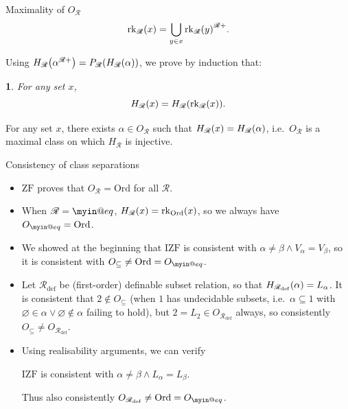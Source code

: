 \documentclass{beamer}
\makeatletter
\newtheorem{named@thm}{\curr@thmname}
\newenvironment{namedthm}[1]
  {\def\curr@thmname{#1}\begin{named@thm}}
  {\end{named@thm}}
\newcommand{\ZF}{\mathrm{ZF}}
\newcommand{\IZF}{\mathrm{IZF}}
\newcommand{\Ord}{\mathrm{Ord}}
\def\myineq{\mathrel{\mathpalette\myin@eq\relax}}
\def\myin@eq#1#2{%
  \setbox\myin@eqfst=\hbox{\m@th$#1\in$}%
  \setbox\myin@eqsnd=\hb@xt@\wd\myin@eqfst{\m@th$#1\dabar@$\hss$#1\dabar@$}%
  \vcenter{\offinterlineskip%
    \box\myin@eqfst\vskip-.1\ht\myin@eqsnd%
    \copy\myin@eqsnd\vskip-.5\ht\myin@eqsnd}}
\makeatother
\begin{document}
\begin{frame}{Maximality of $O_\mathscr{R}$}
  \[\mathrm{rk}_\mathscr{R}\mleft(x\mright) = \bigcup_{y \in x} \mathrm{rk}_\mathscr{R}\mleft(y\mright)^{\mathscr{R}+}.\]

  Using $H_\mathscr{R}\mleft(\alpha^{\mathscr{R}+}\mright) = P_\mathscr{R}\mleft(H_\mathscr{R}\mleft(\alpha\mright)\mright)$, we prove by induction that:
  \begin{namedthm}{Proposition}
    For any set $x$,
    \[H_\mathscr{R}\mleft(x\mright) = H_\mathscr{R}\mleft(\mathrm{rk}_\mathscr{R}\mleft(x\mright)\mright).\]
  \end{namedthm}

  \begin{corollary}
    For any set $x$, there exists $\alpha \in O_\mathscr{R}$ such that $H_\mathscr{R}\mleft(x\mright) = H_\mathscr{R}\mleft(\alpha\mright)$, i.e.\ $O_\mathscr{R}$ is a maximal class on which $H_\mathscr{R}$ is injective.
  \end{corollary}
\end{frame}

\begin{frame}{Consistency of class separations}
  \begin{itemize}
    \item $\ZF$ proves that $O_\mathscr{R} = \Ord$ for all $\mathscr{R}$.

    \item When $\mathscr{R} = {\myineq}$, $H_\mathscr{R}\mleft(x\mright) = \mathrm{rk}_\Ord\mleft(x\mright)$, so we always have $O_{\myineq} = \Ord$.

          \pause

    \item We showed at the beginning that $\IZF$ is consistent with $\alpha \neq \beta \land V_\alpha = V_\beta$, so it is consistent with $O_\subseteq \neq \Ord = O_{\myineq}$.

          \pause

    \item Let $\mathscr{R}_\mathrm{def}$ be (first-order) definable subset relation, so that $H_{\mathscr{R}_\mathrm{def}}\mleft(\alpha\mright) = L_\alpha$. It is consistent that $2 \not\in O_\subseteq$ (when $1$ has undecidable subsets, i.e.\ $\alpha \subseteq 1$ with $\varnothing \in \alpha \lor \varnothing \not\in \alpha$ failing to hold), but $2 = L_2 \in O_{\mathscr{R}_\mathrm{def}}$ always, so consistently $O_\subseteq \neq O_{\mathscr{R}_\mathrm{def}}$.

          \pause

    \item Using realisability arguments, we can verify
          \begin{theorem}
            $\IZF$ is consistent with $\alpha \neq \beta \land L_\alpha = L_\beta$.
          \end{theorem}
          Thus also consistently $O_{\mathscr{R}_\mathrm{def}} \neq \Ord = O_{\myineq}$.
  \end{itemize}
\end{frame}
\end{document}
